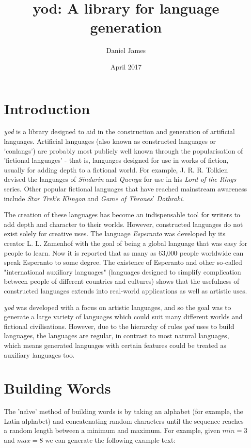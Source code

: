 \documentclass{report}
\title{yod: A library for language generation}
\author{Daniel James}
\date{April 2017}
\begin{document}
   \maketitle
   
   \chapter{Introduction}
   \textit{yod} is a library designed to aid in the construction and generation of artificial languages. Artificial languages (also known as constructed languages or 'conlangs') are probably most publicly well known through the popularisation of 'fictional languages' - that is, languages designed for use in works of fiction, usually for adding depth to a fictional world. For example, J. R. R. Tolkien devised the languages of \textit{Sindarin} and \textit{Quenya} for use in his \textit{Lord of the Rings} series. Other popular fictional languages that have reached mainstream awareness include \textit{Star Trek}'s \textit{Klingon} and \textit{Game of Thrones}' \textit{Dothraki}.
   
   The creation of these languages has become an indispensable tool for writers to add depth and character to their worlds. However, constructed languages do not exist solely for creative uses. The language \textit{Esperanto} was developed by its creator L. L. Zamenhof with the goal of being a global language that was easy for people to learn\cite{unualibro}. Now it is reported that as many as 63,000 people worldwide can speak Esperanto to some degree\cite{esperanto}. The existence of Esperanto and other so-called "international auxiliary languages" (languages designed to simplify complication between people of different countries and cultures) shows that the usefulness of constructed languages extends into real-world applications as well as artistic uses.
   
   \textit{yod} was developed with a focus on artistic languages, and so the goal was to generate a large variety of languages which could suit many different worlds and fictional civilisations. However, due to the hierarchy of rules \textit{yod} uses to build languages, the languages are regular, in contrast to most natural languages, which means generated languages with certain features could be treated as auxiliary languages too.
   
   
   \chapter{Building Words}
   The 'na\"{\i}ve' method of building words is by taking an alphabet (for example, the Latin alphabet) and concatenating random characters until the sequence reaches a random length between a minimum and maximum. For example, given $min = 3$ and $max = 8$ we can generate the following example text:
   
\end{document}
